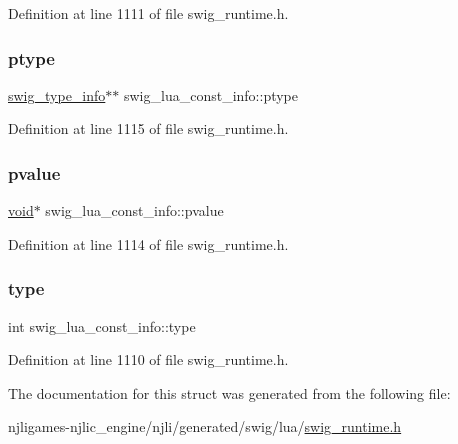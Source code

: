 Definition at line 1111 of file swig\+\_\+runtime.\+h.

\mbox{\label{structswig__lua__const__info_a0557056988d98840029075f204d2bf59}} 
\subsubsection{\texorpdfstring{ptype}{ptype}}
{\footnotesize\ttfamily \mbox{\hyperlink{structswig__type__info}{swig\+\_\+type\+\_\+info}}$\ast$$\ast$ swig\+\_\+lua\+\_\+const\+\_\+info\+::ptype}



Definition at line 1115 of file swig\+\_\+runtime.\+h.

\mbox{\label{structswig__lua__const__info_a54637f2603b1179d4996c06e82e3f23a}} 
\subsubsection{\texorpdfstring{pvalue}{pvalue}}
{\footnotesize\ttfamily \mbox{\hyperlink{_thread_8h_af1e856da2e658414cb2456cb6f7ebc66}{void}}$\ast$ swig\+\_\+lua\+\_\+const\+\_\+info\+::pvalue}



Definition at line 1114 of file swig\+\_\+runtime.\+h.

\mbox{\label{structswig__lua__const__info_a1c9ffb014aea4d37c1b73e0a446c9be1}} 
\subsubsection{\texorpdfstring{type}{type}}
{\footnotesize\ttfamily int swig\+\_\+lua\+\_\+const\+\_\+info\+::type}



Definition at line 1110 of file swig\+\_\+runtime.\+h.



The documentation for this struct was generated from the following file\+:\begin{DoxyCompactItemize}
\item 
njligames-\/njlic\+\_\+engine/njli/generated/swig/lua/\mbox{\hyperlink{swig__runtime_8h}{swig\+\_\+runtime.\+h}}\end{DoxyCompactItemize}
